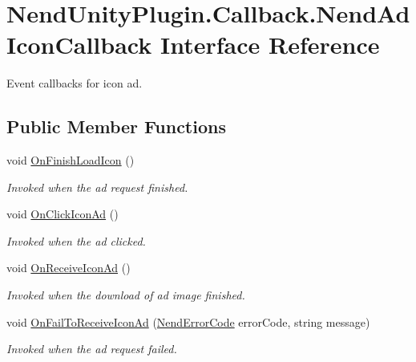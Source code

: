 \hypertarget{interface_nend_unity_plugin_1_1_callback_1_1_nend_ad_icon_callback}{}\section{Nend\+Unity\+Plugin.\+Callback.\+Nend\+Ad\+Icon\+Callback Interface Reference}
\label{interface_nend_unity_plugin_1_1_callback_1_1_nend_ad_icon_callback}


Event callbacks for icon ad.  


\subsection*{Public Member Functions}
\begin{DoxyCompactItemize}
\item 
void \hyperlink{interface_nend_unity_plugin_1_1_callback_1_1_nend_ad_icon_callback_ae6e36b87b814200a2135bdc66694184b}{On\+Finish\+Load\+Icon} ()
\begin{DoxyCompactList}\small\item\em Invoked when the ad request finished. \end{DoxyCompactList}\item 
void \hyperlink{interface_nend_unity_plugin_1_1_callback_1_1_nend_ad_icon_callback_a14a4431ef8ac95e722fc64efc019482f}{On\+Click\+Icon\+Ad} ()
\begin{DoxyCompactList}\small\item\em Invoked when the ad clicked. \end{DoxyCompactList}\item 
void \hyperlink{interface_nend_unity_plugin_1_1_callback_1_1_nend_ad_icon_callback_a43063f0a0e849a29ec268ec6ca9b6361}{On\+Receive\+Icon\+Ad} ()
\begin{DoxyCompactList}\small\item\em Invoked when the download of ad image finished. \end{DoxyCompactList}\item 
void \hyperlink{interface_nend_unity_plugin_1_1_callback_1_1_nend_ad_icon_callback_a59e0e5c4dae522c59a6ee0242c33011b}{On\+Fail\+To\+Receive\+Icon\+Ad} (\hyperlink{namespace_nend_unity_plugin_1_1_common_a9bcb251827acb8ae5f3a35fc9de7195e}{Nend\+Error\+Code} error\+Code, string message)
\begin{DoxyCompactList}\small\item\em Invoked when the ad request failed. \end{DoxyCompactList}\end{DoxyCompactItemize}


